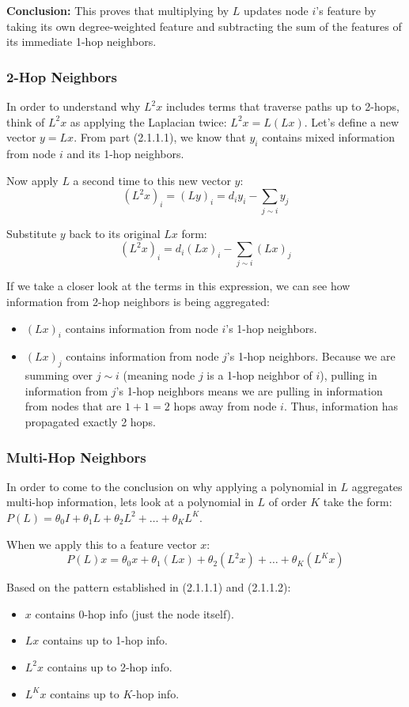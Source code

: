 \documentclass[twoside, 10pt]{article}
\begin{document}
\textbf{Conclusion:} This proves that multiplying by $L$ updates node $i$'s feature by taking its own degree-weighted feature and subtracting the sum of the features of its immediate 1-hop neighbors.

\subsubsection{2-Hop Neighbors}
In order to understand why $L^2 x$ includes terms that traverse paths up to 2-hops, think of $L^2 x$ as applying the Laplacian twice: $L^2 x = L(Lx)$. Let's define a new vector $y = Lx$. From part (2.1.1.1), we know that $y_i$ contains mixed information from node $i$ and its 1-hop neighbors.

Now apply $L$ a second time to this new vector $y$:
\[ (L^2 x)_i = (Ly)_i = d_i y_i - \sum_{j \sim i} y_j \]

Substitute $y$ back to its original $Lx$ form:
\[ (L^2 x)_i = d_i (Lx)_i - \sum_{j \sim i} (Lx)_j \]

If we take a closer look at the terms in this expression, we can see how information from 2-hop neighbors is being aggregated:
\begin{itemize}
    \item $(Lx)_i$ contains information from node $i$'s 1-hop neighbors.
    \item $(Lx)_j$ contains information from node $j$'s 1-hop neighbors. Because we are summing over $j \sim i$ (meaning node $j$ is a 1-hop neighbor of $i$), pulling in information from $j$'s 1-hop neighbors means we are pulling in information from nodes that are $1+1=2$ hops away from node $i$. Thus, information has propagated exactly 2 hops.
\end{itemize}

\subsubsection{Multi-Hop Neighbors}
In order to come to the conclusion on why applying a polynomial in $L$ aggregates multi-hop information, lets look at a polynomial in $L$ of order $K$ take the form: $P(L) = \theta_0 I + \theta_1 L + \theta_2 L^2 + \dots + \theta_K L^K$.

When we apply this to a feature vector $x$:
\[ P(L)x = \theta_0 x + \theta_1 (Lx) + \theta_2 (L^2 x) + \dots + \theta_K (L^K x) \]

Based on the pattern established in (2.1.1.1) and (2.1.1.2):
\begin{itemize}
    \item $x$ contains 0-hop info (just the node itself).
    \item $Lx$ contains up to 1-hop info.
    \item $L^2 x$ contains up to 2-hop info.
    \item $L^K x$ contains up to $K$-hop info.
\end{itemize}
\end{document}
